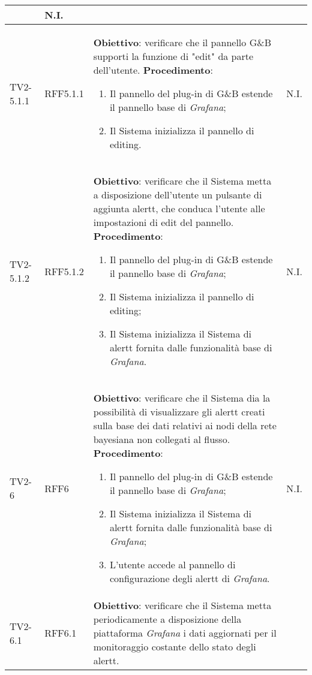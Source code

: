 \begin{longtable}{|C{.15\textwidth}|C{.13\textwidth}|m{.52\textwidth}|C{.08\textwidth}|}
	& N.I. \\
\hline
{}TV2-5.1.1 & RFF5.1.1 &
	\textbf{Obiettivo}: verificare che il pannello G\&B supporti la funzione di "edit" da parte dell'utente. \newline
	\textbf{Procedimento}:
	\begin{enumerate}
		\item Il pannello del plug-in di G\&B estende il pannello base di \textit{Grafana};
		\item Il Sistema inizializza il pannello di editing.
	\end{enumerate}
	& N.I. \\
\hline
TV2-5.1.2 & RFF5.1.2 &
	\textbf{Obiettivo}: verificare che il Sistema metta a disposizione dell'utente un pulsante di aggiunta alertt, che conduca l'utente alle impostazioni di edit del pannello. \newline
	\textbf{Procedimento}:
	\begin{enumerate}
		\item Il pannello del plug-in di G\&B estende il pannello base di \textit{Grafana};
		\item Il Sistema inizializza il pannello di editing;
		\item Il Sistema inizializza il Sistema di alertt fornita dalle funzionalità base di \textit{Grafana}.
	\end{enumerate}
	& N.I. \\
\hline
{}TV2-6 & RFF6 &
	\textbf{Obiettivo}: verificare che il Sistema dia la possibilità di visualizzare gli alertt creati sulla base dei dati relativi ai nodi della rete bayesiana non collegati al flusso. \newline
	\textbf{Procedimento}:
	\begin{enumerate}
		\item Il pannello del plug-in di G\&B estende il pannello base di \textit{Grafana};
		\item Il Sistema inizializza il Sistema di alertt fornita dalle funzionalità base di \textit{Grafana};
		\item L'utente accede al pannello di configurazione degli alertt di \textit{Grafana}.
	\end{enumerate}
	& N.I. \\
\hline
TV2-6.1 & RFF6.1 &
	\textbf{Obiettivo}: verificare che il Sistema metta periodicamente a disposizione della piattaforma \textit{Grafana} i dati aggiornati per il monitoraggio costante dello stato degli alertt. \newline

\end{longtable}
